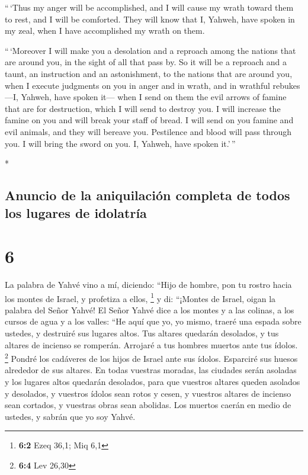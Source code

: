 \begin{paracol}{2}
\begin{otherlanguage}{english}
 ``\,`Thus my anger will be accomplished, and I will
cause my wrath toward them to rest, and I will be comforted. They will
know that I, Yahweh, have spoken in my zeal, when I have accomplished my
wrath on them.

 ``\,`Moreover I will make you a desolation and a
reproach among the nations that are around you, in the sight of all that
pass by.  So it will be a reproach and a taunt, an
instruction and an astonishment, to the nations that are around you,
when I execute judgments on you in anger and in wrath, and in wrathful
rebukes---I, Yahweh, have spoken it---  when I send on
them the evil arrows of famine that are for destruction, which I will
send to destroy you. I will increase the famine on you and will break
your staff of bread.  I will send on you famine and evil
animals, and they will bereave you. Pestilence and blood will pass
through you. I will bring the sword on you. I, Yahweh, have spoken
it.'\,''

\end{otherlanguage}

\switchcolumn[0]*

\hypertarget{anuncio-de-la-aniquilaciuxf3n-completa-de-todos-los-lugares-de-idolatruxeda}{%
\subsection{Anuncio de la aniquilación completa de todos los lugares de
idolatría}\label{anuncio-de-la-aniquilaciuxf3n-completa-de-todos-los-lugares-de-idolatruxeda}}

\hypertarget{section-10}{%
\section{6}\label{section-10}}

 La palabra de Yahvé vino a mí, diciendo: 
``Hijo de hombre, pon tu rostro hacia los montes de Israel, y profetiza
a ellos, \footnote{\textbf{6:2} Ezeq 36,1; Miq 6,1}  y di:
``¡Montes de Israel, oigan la palabra del Señor Yahvé! El Señor Yahvé
dice a los montes y a las colinas, a los cursos de agua y a los valles:
``He aquí que yo, yo mismo, traeré una espada sobre ustedes, y destruiré
sus lugares altos.  Tus altares quedarán desolados, y tus
altares de incienso se romperán. Arrojaré a tus hombres muertos ante tus
ídolos. \footnote{\textbf{6:4} Lev 26,30}  Pondré los
cadáveres de los hijos de Israel ante sus ídolos. Esparciré sus huesos
alrededor de sus altares.  En todas vuestras moradas, las
ciudades serán asoladas y los lugares altos quedarán desolados, para que
vuestros altares queden asolados y desolados, y vuestros ídolos sean
rotos y cesen, y vuestros altares de incienso sean cortados, y vuestras
obras sean abolidas.  Los muertos caerán en medio de
ustedes, y sabrán que yo soy Yahvé.


\end{paracol}
